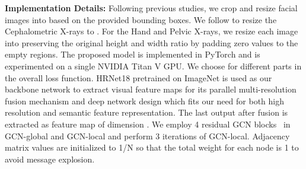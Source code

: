 \documentclass[runningheads]{llncs}
\begin{document}
\noindent\textbf{Implementation Details:} Following previous studies, we crop and resize facial images into  based on the provided bounding boxes. We follow \cite{chen2019cephalometric} to resize the Cephalometric X-rays to . For the Hand and Pelvic X-rays, we resize each image into  preserving the original height and width ratio by padding zero values to the empty regions. The proposed model is implemented in PyTorch and is experimented on a single NVIDIA Titan V GPU. We choose  for different parts in the overall loss function. HRNet18 \cite{sun2019deep} pretrained on ImageNet is used as our backbone network to extract visual feature maps for its parallel multi-resolution fusion mechanism and deep network design which fits our need for both high resolution and semantic feature representation. The last output after fusion is extracted as feature map of dimension . We employ 4 residual GCN blocks~\cite{ling2019fast,li2019can} in GCN-global and GCN-local and perform 3 iterations of GCN-local. Adjacency matrix values are initialized to 1/N so that the total weight for each node is 1 to avoid message explosion. 
\end{document}
